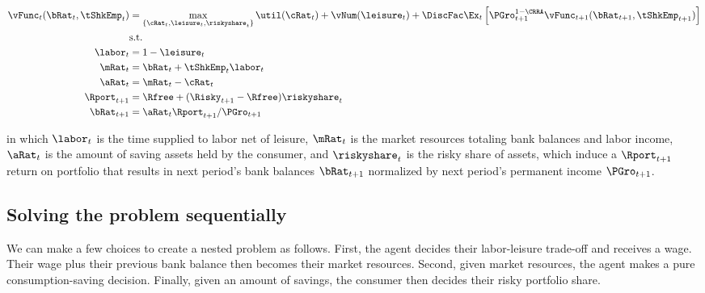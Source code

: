 \documentclass[\econtexRoot/EGMN]{subfiles}
\begin{document}
\begin{equation}
  \begin{split}
    \vFunc_{t}(\bRat_{t}, \tShkEmp_{t}) & = \max_{\{\cRat_{t},
      \leisure_{t}, \riskyshare_{t}\}} \util(\cRat_{t}) +
    \vNum(\leisure_{t}) +
    \DiscFac \Ex_{t} \left[ \PGro_{t+1}^{1-\CRRA}
      \vFunc_{t+1} (\bRat_{t+1},
      \tShkEmp_{t+1}) \right] \\
    & \text{s.t.} \\
    \labor_{t} & = 1 - \leisure_{t} \\
    \mRat_{t} & = \bRat_{t} + \tShkEmp_{t}\labor_{t} \\
    \aRat_{t} & = \mRat_{t} - \cRat_{t} \\
    \Rport_{t+1} & = \Rfree + (\Risky_{t+1} - \Rfree)
    \riskyshare_{t} \\
    \bRat_{t+1} & = \aRat_{t} \Rport_{t+1} / \PGro_{t+1}
  \end{split}
\end{equation}

in which $\labor_{t}$ is the time supplied to labor net of leisure, $\mRat_{t}$ is the market resources totaling bank balances and labor income, $\aRat_{t}$ is the amount of saving assets held by the consumer, and $\riskyshare_{t}$ is the risky share of assets, which induce a $\Rport_{t+1}$ return on portfolio that results in next period's bank balances $\bRat_{t+1}$ normalized by next period's permanent income $\PGro_{t+1}$.


\subsection{Solving the problem sequentially}

We can make a few choices to create a nested problem as follows. First, the
agent decides their labor-leisure trade-off and receives a wage. Their wage
plus their previous bank balance then becomes their market resources. Second, given
market resources, the agent makes a pure consumption-saving decision. Finally, given an amount of savings, the consumer then decides their risky portfolio share.
\end{document}
